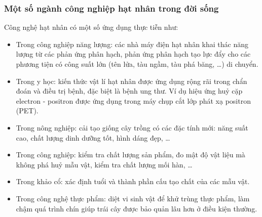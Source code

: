 \begin{tomtat}
	\subsubsection{Một số ngành công nghiệp hạt nhân trong đời sống}
	Công nghệ hạt nhân có một số ứng dụng thực tiễn như:
	\begin{itemize}
		\item Trong công nghiệp năng lượng: các nhà máy điện hạt nhân khai thác năng lượng từ các phản ứng phân hạch, phản ứng phân hạch tạo lực đẩy cho các phương tiện có công suất lớn (tên lửa, tàu ngầm, tàu phá băng, \dots) di chuyển.
		\item Trong y học: kiến thức vật lí hạt nhân được ứng dụng rộng rãi trong chẩn đoán và điều trị bệnh, đặc biệt là bệnh ung thư. Ví dụ hiệu ứng huỷ cặp electron - positron được ứng dụng trong máy chụp cắt lớp phát xạ positron (PET).
		\item Trong nông nghiệp: cải tạo giống cây trồng có các đặc tính mới: năng suất cao, chất lượng dinh dưỡng tốt, hình dáng đẹp, \dots
		\item Trong công nghiệp: kiểm tra chất lượng sản phẩm, đo mật độ vật liệu mà không phá huỷ mẫu vật, kiểm tra chất lượng mối hàn, \dots
		\item Trong khảo cổ: xác định tuổi và thành phần cấu tạo chất của các mẫu vật.
		\item Trong công nghệ thực phẩm: diệt vi sinh vật để khử trùng thực phẩm, làm chậm quá trình chín giúp trái cây được bảo quản lâu hơn ở điều kiện thường.
	\end{itemize}
\end{tomtat}
